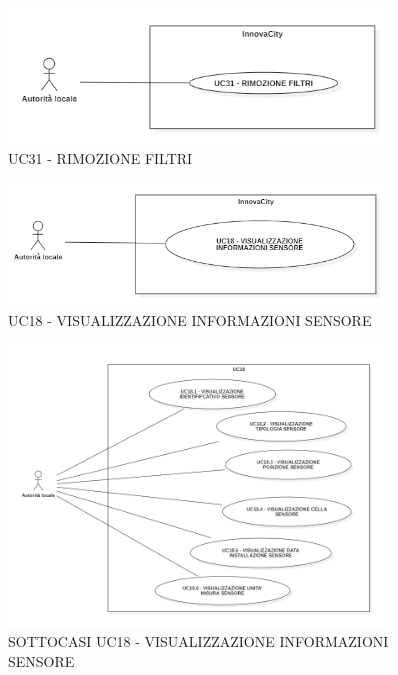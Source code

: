 \begin{figure}[H]
    \centering
    \includegraphics[width=0.9\textwidth]{../Images/uc31.PNG}
    \caption{UC31 - RIMOZIONE FILTRI }
    \label{fig:UC7}
\end{figure}



\begin{figure}[H]
    \centering
    \includegraphics[width=0.9\textwidth]{../Images/uc18.PNG}
    \caption{UC18 - VISUALIZZAZIONE INFORMAZIONI SENSORE }
\end{figure}



\begin{figure}[H]
    \centering
    \includegraphics[width=0.9\textwidth]{../Images/uc18sub.PNG}
    \caption{SOTTOCASI UC18 - VISUALIZZAZIONE INFORMAZIONI SENSORE }
\end{figure}

